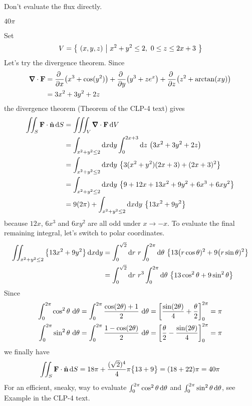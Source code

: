 \begin{hint} 
Don't evaluate the flux directly.
\end{hint}

\begin{answer} 
$40\pi$
\end{answer}

\begin{solution} 
Set
\begin{equation*}
V=\big\{ \ (x,y,z)\ \big|\ x^2+y^2\le 2,\ 0\le z\le 2x+3\ \big\}
\end{equation*}
Let's try the divergence theorem. Since
\begin{align*}
\vnabla\cdot\vF &= 
    \pdiff{}{x}\big(x^3 + \cos(y^2)\big)
     +\pdiff{}{y}\big(y^3 + ze^x\big)
     +\pdiff{}{z}\big(z^2 + \arctan(xy)\big) \\
   &=3x^2+3y^2+2z
\end{align*}
the divergence theorem (Theorem  of the CLP-4 text) 
gives
\begin{align*}
\dblInt_S \vF \cdot \hn\,\dee{S}
&=\tripInt_V \vnabla\cdot\vF\,\dee{V} \\
&=\int_{x^2+y^2\le 2}\dee{x}\dee{y}\int_0^{2x+3}\dee{z}\ 
      \big(3x^2+3y^2+2z\big) \\
&= \int_{x^2+y^2\le 2}\dee{x}\dee{y}\ 
      \big\{3(x^2+y^2)(2x+3)+(2x+3)^2\big\} \\
&= \int_{x^2+y^2\le 2}\dee{x}\dee{y}\ 
      \big\{9+12x+13x^2+9y^2+6x^3+6xy^2\big\} \\
&= 9(2\pi) +\int_{x^2+y^2\le 2}\dee{x}\dee{y}\ 
      \big\{13x^2+9y^2\big\} 
\end{align*}
because $12x$, $6x^3$ and $6xy^2$ are all odd under $x\rightarrow -x$.
To evaluate the final remaining integral, let's switch to polar coordinates.
\begin{align*}
\iint_{x^2+y^2\le 2} \big\{13x^2+9y^2\big\}\,\mathrm{d}x\mathrm{d}y
&=\int_0^{\sqrt{2}}\mathrm{d}r\ r\int_0^{2\pi}\mathrm{d}\theta\  
\big\{13\big(r\cos\theta)^2+9\big(r\sin\theta)^2\big\} \\
&=\int_0^{\sqrt{2}} \mathrm{d}r\ r^3\int_0^{2\pi}\mathrm{d}\theta\
\big\{ 13\cos^2\theta+9\sin^2\theta\big\}
\end{align*}
Since
\begin{align*}
\int_0^{2\pi}\cos^2\theta\ \mathrm{d}\theta
&=\int_0^{2\pi}\frac{\cos(2\theta)+1}{2}\ \mathrm{d}\theta
=\left[\frac{\sin(2\theta)}{4}+\frac{\theta}{2}\right]_0^{2\pi}
=\pi
\\
\int_0^{2\pi}\sin^2\theta\ \mathrm{d}\theta
&=\int_0^{2\pi}\frac{1-\cos(2\theta)}{2}\ \mathrm{d}\theta
=\left[\frac{\theta}{2}-\frac{\sin(2\theta)}{4}\right]_0^{2\pi}
=\pi
\end{align*}
we finally have
\begin{equation*}
\iint_S \mathbf{F} \cdot \hat{\mathbf{n}}\,\mathrm{d}S
=18\pi+\frac{(\sqrt{2})^4}{4}\pi\big\{13+9\big\}
=(18+22)\pi=40\pi
\end{equation*}
For an efficient, sneaky, way to evaluate 
$\int_0^{2\pi} \cos^2\theta\,\mathrm{d}\theta$ 
and $\int_0^{2\pi} \sin^2\theta\,\mathrm{d}\theta$,
see Example
 in the CLP-4 text.

\end{solution}

